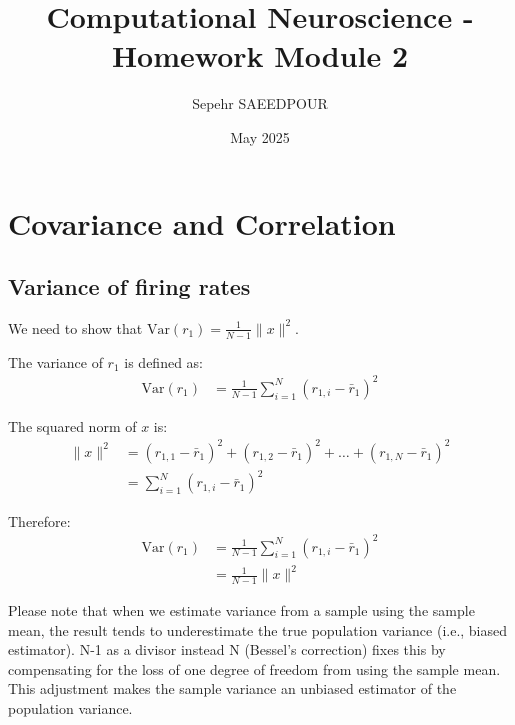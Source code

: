 \documentclass{article}
\title{Computational Neuroscience - Homework Module 2}
\author{Sepehr SAEEDPOUR}
\date{May 2025}
\begin{document}
\maketitle

\section{Covariance and Correlation}

\subsection{Variance of firing rates}
We need to show that $\text{Var}(r_1) = \frac{1}{N-1} \|x\|^2$.

The variance of $r_1$ is defined as:
\begin{align}
\text{Var}(r_1) &= \frac{1}{N-1}\sum_{i=1}^{N}(r_{1,i} - \bar{r}_1)^2
\end{align}


The squared norm of $x$ is:
\begin{align}
\|x\|^2 &= (r_{1,1} - \bar{r}_1)^2 + (r_{1,2} - \bar{r}_1)^2 + \ldots + (r_{1,N} - \bar{r}_1)^2 \\
&= \sum_{i=1}^{N}(r_{1,i} - \bar{r}_1)^2
\end{align}

Therefore:
\begin{align}
\text{Var}(r_1) &= \frac{1}{N-1}\sum_{i=1}^{N}(r_{1,i} - \bar{r}_1)^2 \\
&= \frac{1}{N-1}\|x\|^2
\end{align}

Please note that when we estimate variance from a sample using the sample mean, the result tends to underestimate the true population variance (i.e., biased estimator). N-1 as a divisor instead N (Bessel's correction) fixes this by compensating for the loss of one degree of freedom from using the sample mean. This adjustment makes the sample variance an unbiased estimator of the population variance.
\end{document}
